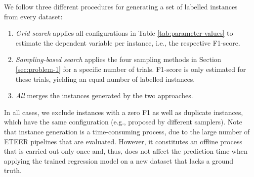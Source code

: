 We follow three different procedures for generating a set of labelled instances from every dataset:
\begin{enumerate}[leftmargin=*]
    \item \textit{Grid search} applies all configurations in Table \ref{tab:parameter-values} to estimate the dependent variable per instance, i.e., the respective F1-score.
    \item \textit{Sampling-based search} applies the four sampling methods in Section \ref{sec:problem-1} for a specific number of trials. F1-score is only estimated for these trials, yielding an equal number of labelled instances.
    \item \textit{All} merges the instances generated by the two approaches.
\end{enumerate}

In all cases, we exclude instances with a zero F1 as well as duplicate instances, which have the same configuration (e.g., proposed by different samplers).
Note that instance generation is a time-consuming process, due to the large number of ETEER pipelines that are evaluated. However, it constitutes an offline process that is carried out only once and, thus, does not affect the prediction time when applying the trained regression model on a new dataset that lacks a ground truth.



